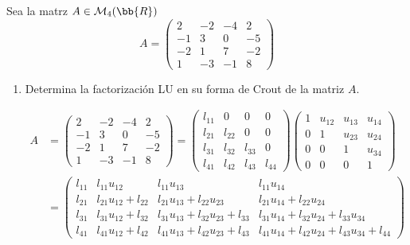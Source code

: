 \begin{ejercicio}
    Sea la matrz $A\in \mathcal{M}_4(\bb{R})$
    $$A = \left( \begin{array}{cccc}
        2 & -2 & -4 & 2 \\
        -1 & 3 & 0 & -5 \\
        -2 & 1 & 7 & -2 \\
        1 & -3 & -1 & 8
    \end{array}\right)$$
    
    \begin{enumerate}
        \item Determina la factorización LU en su forma de Crout de la matriz $A$.

        \begin{equation*}\begin{split} A & = \left(
        \begin{array}{cccc}
            2 & -2 & -4 & 2 \\
            -1 & 3 & 0 & -5 \\
            -2 & 1 & 7 & -2 \\
            1 & -3 & -1 & 8
        \end{array}\right)
        = \left(
        \begin{array}{cccc}
            l_{11} & 0 & 0 & 0\\
            l_{21} & l_{22} & 0 & 0\\
            l_{31} & l_{32} & l_{33} & 0\\
            l_{41} & l_{42} & l_{43} & l_{44}
        \end{array}\right) \left(
        \begin{array}{cccc}
            1 & u_{12} & u_{13} & u_{14}\\
            0 & 1 & u_{23} & u_{24}\\
            0 & 0 & 1 & u_{34}\\
            0 & 0 & 0 & 1
        \end{array}\right) \\ &
        = \left(
        \begin{array}{cccc}
            l_{11} & l_{11}u_{12} & l_{11}u_{13} & l_{11}u_{14}\\
            l_{21} & l_{21}u_{12}+l_{22} & l_{21}u_{13}+l_{22}u_{23} & l_{21}u_{14} + l_{22}u_{24}\\
            l_{31} & l_{31}u_{12}+l_{32} & l_{31}u_{13}+l_{32}u_{23} + l_{33} & l_{31}u_{14}+l_{32}u_{24} + l_{33}u_{34}\\
            l_{41} & l_{41}u_{12}+l_{42} & l_{41}u_{13} + l_{42}u_{23} + l_{43} & l_{41}u_{14} + l_{42}u_{24} + l_{43}u_{34} + l_{44}
        \end{array}\right)
    \end{split}\end{equation*}
    

\end{enumerate}
\end{ejercicio}
